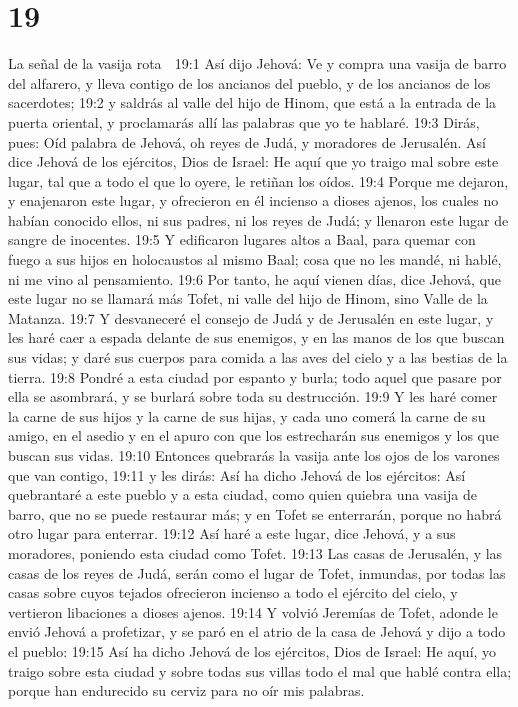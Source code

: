 \chapter{19}

La señal de la vasija rota  

19:1 Así dijo Jehová: Ve y compra una vasija de barro del alfarero, y lleva contigo de los ancianos del pueblo, y de los ancianos de los sacerdotes;  
19:2 y saldrás al valle del hijo de Hinom, que está a la entrada de la puerta oriental, y proclamarás allí las palabras que yo te hablaré.  
19:3 Dirás, pues: Oíd palabra de Jehová, oh reyes de Judá, y moradores de Jerusalén. Así dice Jehová de los ejércitos, Dios de Israel: He aquí que yo traigo mal sobre este lugar, tal que a todo el que lo oyere, le retiñan los oídos.  
19:4 Porque me dejaron, y enajenaron este lugar, y ofrecieron en él incienso a dioses ajenos, los cuales no habían conocido ellos, ni sus padres, ni los reyes de Judá; y llenaron este lugar de sangre de inocentes.  
19:5 Y edificaron lugares altos a Baal, para quemar con fuego a sus hijos en holocaustos al mismo Baal; cosa que no les mandé, ni hablé, ni me vino al pensamiento.  
19:6 Por tanto, he aquí vienen días, dice Jehová, que este lugar no se llamará más Tofet, ni valle del hijo de Hinom, sino Valle de la Matanza.  
19:7 Y desvaneceré el consejo de Judá y de Jerusalén en este lugar, y les haré caer a espada delante de sus enemigos, y en las manos de los que buscan sus vidas; y daré sus cuerpos para comida a las aves del cielo y a las bestias de la tierra.  
19:8 Pondré a esta ciudad por espanto y burla; todo aquel que pasare por ella se asombrará, y se burlará sobre toda su destrucción.  
19:9 Y les haré comer la carne de sus hijos y la carne de sus hijas, y cada uno comerá la carne de su amigo, en el asedio y en el apuro con que los estrecharán sus enemigos y los que buscan sus vidas.  
19:10 Entonces quebrarás la vasija ante los ojos de los varones que van contigo,  
19:11 y les dirás: Así ha dicho Jehová de los ejércitos: Así quebrantaré a este pueblo y a esta ciudad, como quien quiebra una vasija de barro, que no se puede restaurar más; y en Tofet se enterrarán, porque no habrá otro lugar para enterrar.  
19:12 Así haré a este lugar, dice Jehová, y a sus moradores, poniendo esta ciudad como Tofet.  
19:13 Las casas de Jerusalén, y las casas de los reyes de Judá, serán como el lugar de Tofet, inmundas, por todas las casas sobre cuyos tejados ofrecieron incienso a todo el ejército del cielo, y vertieron libaciones a dioses ajenos.  
19:14 Y volvió Jeremías de Tofet, adonde le envió Jehová a profetizar, y se paró en el atrio de la casa de Jehová y dijo a todo el pueblo:  
19:15 Así ha dicho Jehová de los ejércitos, Dios de Israel: He aquí, yo traigo sobre esta ciudad y sobre todas sus villas todo el mal que hablé contra ella; porque han endurecido su cerviz para no oír mis palabras.  

